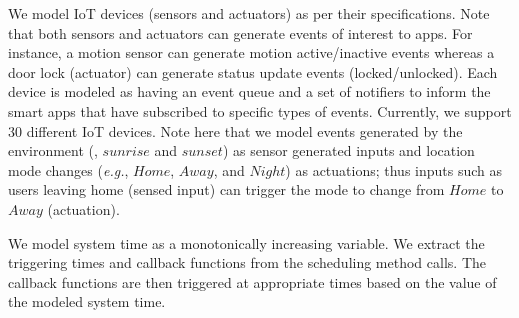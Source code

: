 We model IoT devices (sensors and actuators) as per their specifications.
Note that both sensors and actuators can generate events of interest to apps.
For instance, a motion sensor can generate motion active/inactive events
whereas a door lock (actuator) can generate status update events (locked\allowbreak /unlocked).
Each device is modeled as having an event queue
and a set of notifiers to inform the smart apps that have subscribed to specific types of events.
Currently, we support 30 different IoT devices.
{\color{black} Note here that we model events generated by
the environment (\eg, $sunrise$ and $sunset$) as sensor generated inputs
and location mode changes 
(\textit{e.g.}, $Home$, $Away$, and $Night$) as actuations;
thus inputs such as users leaving home (sensed input) can trigger the mode to change from $Home$ to $Away$ (actuation).} 

{\color{black}We model system time as a monotonically
increasing variable. We extract the triggering times and callback functions from the scheduling
method calls. The callback functions are then triggered at appropriate times based on the value of
the modeled system time.}

